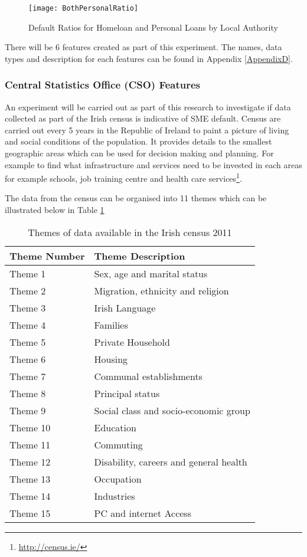 \begin{figure}[H]
	\texttt{[image: BothPersonalRatio]}
	\caption{Default Ratios for Homeloan and Personal Loans by Local Authority}
	\label{fig:BothPersonalRatio}
\end{figure}

There will be 6 features created as part of this experiment. The names, data types and description for each features can be found in Appendix \ref{AppendixD}.


\subsubsection{Central Statistics Office (CSO) Features}
An experiment will be carried out as part of this research to investigate if data collected as part of the Irish census is indicative of SME default. Census are carried out every 5 years in the Republic of Ireland to paint a picture of living and social conditions of the population. It provides details to the smallest geographic areas which can be used for decision making and planning. For example to find what infrastructure and services need to be invested in each areas for example schools, job training centre and health care services\footnote{\url{http://census.ie/}}. 

The data from the census can be organised into 11 themes which can be illustrated below in Table \ref{table:censusThemes}

\begin{table}[H]
	\centering
	\small
	\begin{tabular}{|l|l|}
		\hline
		\textbf{Theme Number} & \textbf{Theme Description} \\ \hline
		Theme 1    & Sex, age and marital status \\ \hline
		Theme 2    & Migration, ethnicity and religion \\ \hline
		Theme 3    & Irish Language \\ \hline
		Theme 4    & Families \\ \hline
		Theme 5    & Private Household \\ \hline
		Theme 6    & Housing \\ \hline
		Theme 7	   & Communal establishments \\ \hline
		Theme 8    & Principal status \\ \hline
		Theme 9    & Social class and socio-economic group \\ \hline
		Theme 10   & Education \\ \hline
		Theme 11   & Commuting \\ \hline	
		Theme 12   & Disability, careers and general health \\ \hline		
		Theme 13   & Occupation \\ \hline
		Theme 14   & Industries \\ \hline
		Theme 15   & PC and internet Access \\ \hline			
	\end{tabular}
	\caption{Themes of data available in the Irish census 2011}
	\label{table:censusThemes}
\end{table}


